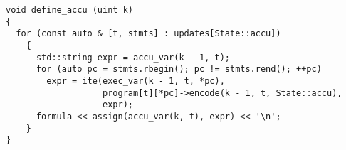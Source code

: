 %
%

\begin{lstlisting}[style=c++]
void define_accu (uint k)
{
  for (const auto & [t, stmts] : updates[State::accu])
    {
      std::string expr = accu_var(k - 1, t);
      for (auto pc = stmts.rbegin(); pc != stmts.rend(); ++pc)
        expr = ite(exec_var(k - 1, t, *pc),
                   program[t][*pc]->encode(k - 1, t, State::accu),
                   expr);
      formula << assign(accu_var(k, t), expr) << '\n';
    }
}
\end{lstlisting}

